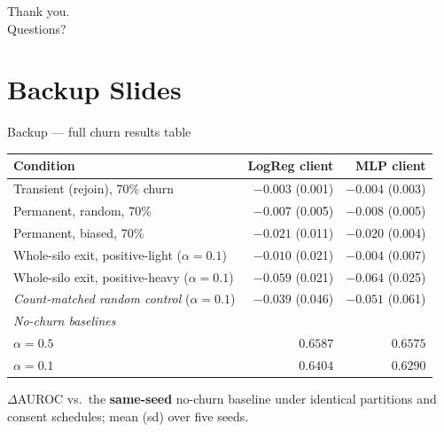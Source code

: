 \documentclass[aspectratio=169, 11pt]{beamer}
\begin{document}
\begin{frame}[standout]
Thank you.\\[0.6em]
{\large Questions?}
\end{frame}

\appendix
\section{Backup Slides}

\begin{frame}{Backup --- full churn results table}
\begin{center}\small
\begin{tabular}{lrr}
\toprule
Condition & LogReg client & MLP client\\
\midrule
Transient (rejoin), 70\% churn                   & $-0.003$ (0.001) & $-0.004$ (0.003)\\
Permanent, random, 70\%                          & $-0.007$ (0.005) & $-0.008$ (0.005)\\
Permanent, biased, 70\%                          & $-0.021$ (0.011) & $-0.020$ (0.004)\\
Whole-silo exit, positive-light ($\alpha{=}0.1$) & $-0.010$ (0.021) & $-0.004$ (0.007)\\
Whole-silo exit, positive-heavy ($\alpha{=}0.1$) & $-0.059$ (0.021) & $-0.064$ (0.025)\\
\emph{Count-matched random control} ($\alpha{=}0.1$) & $-0.039$ (0.046) & $-0.051$ (0.061)\\
\midrule
\multicolumn{3}{l}{\emph{No-churn baselines}}\\
$\alpha{=}0.5$                                   & $0.6587$ & $0.6575$\\
$\alpha{=}0.1$                                   & $0.6404$ & $0.6290$\\
\bottomrule
\end{tabular}
\end{center}
\vspace{0.4em}
{\footnotesize $\Delta$AUROC vs.\ the \textbf{same-seed} no-churn baseline
under identical partitions and consent schedules; mean (sd) over five seeds.}
\end{frame}
\end{document}
